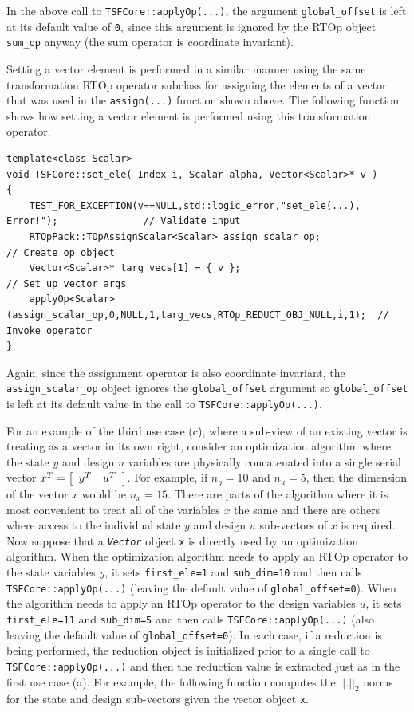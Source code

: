 \noindent In the above call to \texttt{TSFCore::applyOp(\-...)}, the argument
\texttt{global\_offset} is left at its default value of \texttt{0},
since this argument is ignored by the RTOp object \texttt{sum\_op}
anyway (the sum operator is coordinate invariant).

Setting a vector element is performed in a similar manner using the
same transformation RTOp operator subclass for assigning the elements
of a vector that was used in the \texttt{assign(...)} function shown
above.  The following function shows how setting a vector element
is performed using this transformation operator.

{\scriptsize\begin{verbatim}
template<class Scalar>
void TSFCore::set_ele( Index i, Scalar alpha, Vector<Scalar>* v )
{
    TEST_FOR_EXCEPTION(v==NULL,std::logic_error,"set_ele(...), Error!");               // Validate input
    RTOpPack::TOpAssignScalar<Scalar> assign_scalar_op;                             // Create op object
    Vector<Scalar>* targ_vecs[1] = { v };                                           // Set up vector args
    applyOp<Scalar>(assign_scalar_op,0,NULL,1,targ_vecs,RTOp_REDUCT_OBJ_NULL,i,1);  // Invoke operator
}
\end{verbatim}}

\noindent Again, since the assignment operator is also coordinate invariant, the
\texttt{assign\_scalar\_op} object ignores the \texttt{global\_offset}
argument so \texttt{global\_offset} is left at its default value in
the call to \texttt{TSFCore::applyOp(\-...)}.

For an example of the third use case (c), where a sub-view of an
existing vector is treating as a vector in its own right, consider an
optimization algorithm where the state $y$ and design $u$ variables
are physically concatenated into a single serial vector $x^T =
{\bmat{cc} y^T & u^T \emat}$.  For example, if $n_y = 10$ and $n_u =
5$, then the dimension of the vector $x$ would be $n_x = 15$.  There
are parts of the algorithm where it is most convenient to treat all of
the variables $x$ the same and there are others where access to the
individual state $y$ and design $u$ sub-vectors of $x$ is required.
Now suppose that a \texttt{\textit{Vector}} object \texttt{x} is
directly used by an optimization algorithm.  When the optimization
algorithm needs to apply an RTOp operator to the state variables $y$, it
sets \texttt{first\_ele=1} and \texttt{sub\_dim=10} and then calls
\texttt{TSFCore::applyOp(\-...)} (leaving the default value of
\texttt{global\_offset=0}).  When the algorithm needs to apply an
RTOp operator to the design variables $u$, it sets
\texttt{first\_ele=11} and \texttt{sub\_dim=5} and then calls
\texttt{TSFCore::applyOp(\-...)} (also leaving the default value of
\texttt{global\_offset=0}).  In each case, if a reduction is being performed,
the reduction object is initialized prior to a single call to
\texttt{TSFCore::applyOp(\-...)} and then the reduction value is extracted
just as in the first use case (a).  For example, the following
function computes the $||.||_2$ norms for the state and design
sub-vectors given the vector object \texttt{x}.

